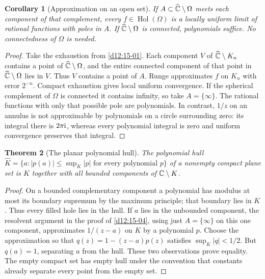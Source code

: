 \documentclass[11pt,a4paper,openany]{book}
\newtheorem{theorem}{Theorem}[chapter]
\newtheorem{corollary}[theorem]{Corollary}
\theoremstyle{definition}
\theoremstyle{remark}\newtheorem{remark}[theorem]{Remark}
\DeclareMathOperator{\Hol}{Hol}\DeclareMathOperator{\Mer}{Mer}
\newcommand{\family}[1]{}
\begin{document}
\begin{corollary}[Approximation on an open set]\family{D12.15.05}\label{d12:15-05}
If $A\subset\widehat{\mathbb C}\setminus\Omega$ meets each component of that complement, every $f\in\Hol(\Omega)$ is a locally uniform limit of rational functions with poles in $A$. If $\widehat{\mathbb C}\setminus\Omega$ is connected, polynomials suffice. No connectedness of $\Omega$ is needed.
\end{corollary}
\begin{proof}
Take the exhaustion from \cref{d12:15-01}. Each component $V$ of $\widehat{\mathbb C}\setminus K_n$ contains a point of $\widehat{\mathbb C}\setminus\Omega$, and the entire connected component of that point in $\widehat{\mathbb C}\setminus\Omega$ lies in $V$. Thus $V$ contains a point of $A$. Runge approximates $f$ on $K_n$ with error $2^{-n}$. Compact exhaustion gives local uniform convergence. If the spherical complement of $\Omega$ is connected it contains infinity, so take $A=\{\infty\}$. The rational functions with only that possible pole are polynomials. In contrast, $1/z$ on an annulus is not approximable by polynomials on a circle surrounding zero: its integral there is $2\pi\mathrm i$, whereas every polynomial integral is zero and uniform convergence preserves that integral.
\end{proof}

\begin{theorem}[The planar polynomial hull]\family{D12.15.06}\label{d12:15-06}
The polynomial hull $\widehat K=\{a:|p(a)|\le\sup_K|p|\text{ for every polynomial }p\}$ of a nonempty compact plane set is $K$ together with all bounded components of $\mathbb C\setminus K$.
\end{theorem}
\begin{proof}
On a bounded complementary component a polynomial has modulus at most its boundary supremum by the maximum principle; that boundary lies in $K$. Thus every filled hole lies in the hull. If $a$ lies in the unbounded component, the resolvent argument in the proof of \cref{d12:15-04}, using just $A=\{\infty\}$ on this one component, approximates $1/(z-a)$ on $K$ by a polynomial $p$. Choose the approximation so that $q(z)=1-(z-a)p(z)$ satisfies $\sup_K|q|<1/2$. But $q(a)=1$, separating $a$ from the hull. These two observations prove equality. The empty compact set has empty hull under the convention that constants already separate every point from the empty set.
\end{proof}
\end{document}
